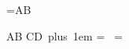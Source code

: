 
=\hbox{\hbox{A}\hbox{B}}

\vbox{
    \hbox{\hbox{A}\hbox{B}}
    \hbox{\hbox{C}\hbox{D}\hskip 0pt plus 1em}
    =\lastbox
    \hbox{%
        =\lastbox
    }
}

\bye